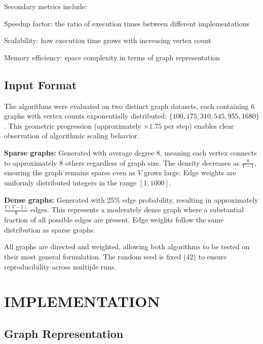 \documentclass[12pt, a4paper]{report}
\begin{document}
Secondary metrics include:
\begin{dashenum}
  \item Speedup factor: the ratio of execution times between different implementations
  \item Scalability: how execution time grows with increasing vertex count
  \item Memory efficiency: space complexity in terms of graph representation
\end{dashenum}

\section{Input Format}

The algorithms were evaluated on two distinct graph datasets, each containing 6 graphs with vertex counts exponentially distributed: $\{100, 175, 310, 545, 955, 1680\}$. This geometric progression (approximately $\times 1.75$ per step) enables clear observation of algorithmic scaling behavior.

\textbf{Sparse graphs:} Generated with average degree 8, meaning each vertex connects to approximately 8 others regardless of graph size. The density decreases as $\frac{8}{V-1}$, ensuring the graph remains sparse even as $V$ grows large. Edge weights are uniformly distributed integers in the range $[1, 1000]$.

\textbf{Dense graphs:} Generated with 25\% edge probability, resulting in approximately $\frac{V(V-1)}{8}$ edges. This represents a moderately dense graph where a substantial fraction of all possible edges are present. Edge weights follow the same distribution as sparse graphs.

All graphs are directed and weighted, allowing both algorithms to be tested on their most general formulation. The random seed is fixed (42) to ensure reproducibility across multiple runs.

\chapter{IMPLEMENTATION}

\section{Graph Representation}
\end{document}
